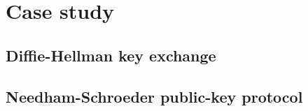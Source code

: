 
\section{Case study}
\label{section:case-study}

\subsection{Diffie-Hellman key exchange}

\subsection{Needham-Schroeder public-key protocol}